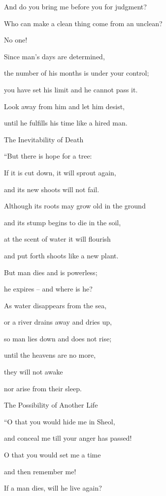 {\par }{\Q And do you bring
me before you for judgment?
\par }{\Q {}Who can
make
a clean
thing come from an unclean?

\par }{\Q No
one!
\par }{\Q {}Since
man’s
days
are determined,

\par }{\Q the number
of his months
is under your control;
\par }{\Q you have set his limit
and he
cannot
pass it.
\par }{\Q {}Look away
from him
and let him desist,
\par }{\Q until
he fulfills his time
like a hired man.
\par }{\SH The Inevitability of Death
\par }{\Q {}“But there is
hope
for a tree:

\par }{\Q If
it is cut down,
it will sprout
again,
\par }{\Q and its new shoots
will not
fail.
\par }{\Q {}Although
its roots
may grow old
in the ground
\par }{\Q and its stump
begins to die
in the soil,
\par }{\Q {}at
the scent
of water
it will flourish
\par }{\Q and put forth shoots
like
a new plant.
\par }{\Q {}But man
dies
and is powerless;
\par }{\Q he
expires
– and where is he?
\par }{\Q {}As water
disappears
from
the sea,
\par }{\Q or a river
drains away
and dries up,
\par }{\Q {}so man
lies
down and does not
rise;
\par }{\Q until
the heavens
are no
more,
\par }{\Q they will not
awake
\par }{\Q nor arise from their sleep.
\par }{\SH The Possibility of Another Life
\par }{\Q {}“O that you would
hide me
in Sheol,
\par }{\Q and conceal
me till
your anger
has passed!

\par }{\Q O that you would set me a time
\par }{\Q and then remember me!
\par }{\Q {}If
a man
dies,
will he live
again?

}

